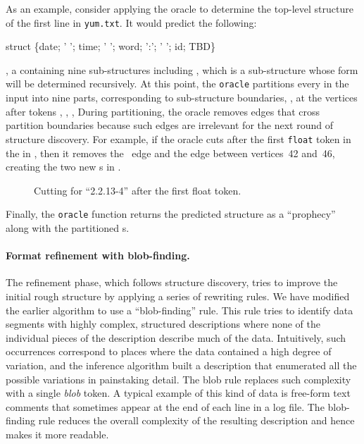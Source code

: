 As an example, consider applying the oracle to determine the top-level
structure of the first line in \texttt{yum.txt}.  It would predict the
following: 
\begin{centercode}
struct \{date;  ' '; time; ' '; word; ':'; ' '; id; TBD\}
\end{centercode}
\ie{}, a  containing nine sub-structures including , which is
a sub-structure whose form will be determined recursively.
At this point, the {\tt oracle} partitions
every \seqset{} in the input into nine parts, corresponding to
sub-structure boundaries,
\ie{}, at the vertices after tokens , , ,
\etc{}
During partitioning, the oracle removes \seqset{} edges that cross partition
boundaries because such edges are irrelevant for the next round
of structure discovery.
For example, if the oracle cuts after the first {\tt float} token in the \seqset{}
in , then it removes the ~edge and the  edge between
vertices~42 and~46, creating the two new \seqset{}s in .
%
\begin{figure}[tb]
\begin{center}
\end{center}
\caption{Cutting \seqset{} for ``2.2.13-4'' after the first float token.} \label{fig:cut}
\end{figure}
%
Finally, the {\tt oracle} function returns the predicted structure as a ``prophecy''
along with the partitioned \seqset{}s. 

\paragraph*{Format refinement with blob-finding.}
The refinement phase, which follows structure discovery, tries to
improve the initial rough structure by applying a series of
rewriting rules.  We have modified the earlier algorithm to use a 
``blob-finding'' rule.  This rule tries to identify data segments 
with highly complex, structured descriptions where none of the 
individual pieces of the description describe much of the data.
Intuitively, such occurrences correspond to places where the data
contained a high degree of variation, and the inference algorithm
built a description that enumerated all the possible variations in
painstaking detail. 
The blob rule replaces such complexity with a single \textit{blob} token.
A typical example of this kind
of data is free-form text comments that sometimes appear at the end of
each line in a log file.  The blob-finding rule reduces the overall
complexity of the resulting description and hence makes it more
readable.

